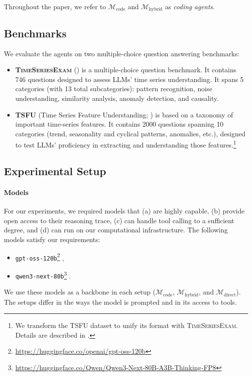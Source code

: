 \documentclass[11pt]{article}
\renewcommand{\cite}{\citep}
\newcommand{\mdirect}{$\mathcal{M}_{\text{direct}}$}
\newcommand{\mcode}{$\mathcal{M}_{\text{code}}$}
\newcommand{\mhybrid}{$\mathcal{M}_{\text{hybrid}}$}
\begin{document}
 Throughout the paper, we refer to \mcode{} and \mhybrid{} as \emph{coding agents}.





\subsection{Benchmarks}

We evaluate the agents on two multiple-choice question answering benchmarks:

\begin{itemize}
  \item \textbf{\textsc{TimeSeriesExam}} (\citealp{merrill2024language}) is a multiple-choice question benchmark. It contains 746 questions designed to assess LLMs' time series understanding. It spans 5 categories (with 13 total subcategories): pattern recognition, noise understanding, similarity analysis, anomaly detection, and causality.
  \item \textbf{\textsc{TSFU}} (Time Series Feature Understanding; \citealp{fons2024evaluatinga}) is based on a taxonomy of important time-series features. It contains 2000 questions spanning 10 categories (trend, seasonality and cyclical patterns, anomalies, etc.), designed to test LLMs' proficiency in extracting and understanding those features.\footnote{We transform the TSFU dataset to unify its format with \textsc{TimeSeriesExam}. Details are described in .}
\end{itemize}



\subsection{Experimental Setup}
\label{sec:setup}
\paragraph{Models} For our experiments, we required models that (a) are highly capable, (b) provide open access to their reasoning trace, (c) can handle tool calling to a sufficient degree, and (d) can run on our computational infrastructure. The following models satisfy our requirements:
\begin{itemize}
  \item \texttt{gpt-oss-120b}\footnote{\url{https://huggingface.co/openai/gpt-oss-120b}} \cite{agarwal2025gpt},
  \item \texttt{qwen3-next-80b}\footnote{\url{https://huggingface.co/Qwen/Qwen3-Next-80B-A3B-Thinking-FP8}}  \cite{yang2025qwen3}.
\end{itemize}
We use these models as a backbone in each setup (\mcode{}, \mhybrid{}, and \mdirect{}). The setups differ in the ways the model is prompted and in its access to tools.
\end{document}
